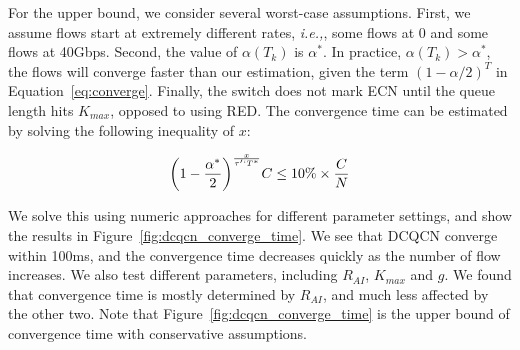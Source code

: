 For the upper bound, we consider several worst-case assumptions. First, we assume flows start
at extremely different rates, {\em i.e.,}, some flows at 0 and some flows at 40Gbps. Second, the value of 
$\alpha ({T_k})$ is $\alpha ^*$. In practice, $\alpha ({T_k}) > \alpha ^*$, the flows 
will converge faster than our estimation, given the term $(1 - \alpha /2)^T$ in Equation~\ref{eq:converge}.
Finally, the switch does not mark ECN until the queue length hits $K_{max}$, opposed to
using RED. The convergence time can be estimated by solving the following inequality of $x$: 

\begin{equation}
\small
{\left( {1 - \frac{{{\alpha ^*}}}{2}} \right)^{\frac{x}{{\tau '`{T^*}}}}}C \le 10\% \times \frac{C}{N}
\end{equation}

We solve this using numeric approaches for different parameter settings, and show the results
in Figure~\ref{fig:dcqcn_converge_time}. We see that DCQCN converge within 100ms, and the convergence
time decreases quickly as the number of flow increases. We also test different parameters, 
including $R_{AI}$, $K_{max}$ and $g$. We found that convergence time is mostly determined by
$R_{AI}$, and much less affected by the other two. Note that Figure~\ref{fig:dcqcn_converge_time}
is the upper bound of convergence time with conservative assumptions. 
